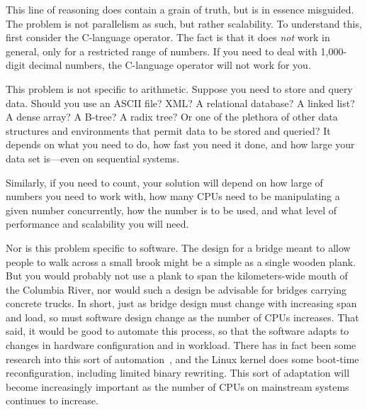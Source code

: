 This line of reasoning does contain a grain of truth, but is in essence
misguided.
The problem is not parallelism as such, but rather scalability.
To understand this, first consider the C-language \co{++} operator.
The fact is that it does \emph{not} work in general, only for a restricted
range of numbers.
If you need to deal with 1,000-digit decimal numbers, the C-language \co{++}
operator will not work for you.

\QuickQuizEnd

This problem is not specific to arithmetic.
Suppose you need to store and query data.
Should you use an ASCII file?
XML\@?
A relational database?
A linked list?
A dense array?
A B-tree?
A radix tree?
Or one of the plethora of other data
structures and environments that permit data to be stored and queried?
It depends on what you need to do, how fast you need it done, and how
large your data set is---even on sequential systems.

Similarly, if you need to count, your solution will depend on how large
of numbers you need to work with, how many CPUs need to be manipulating
a given number concurrently, how the number is to be used, and what
level of performance and scalability you will need.

Nor is this problem specific to software.
The design for a bridge meant to allow people to walk across a small brook
might be a simple as a single wooden plank.
But you would probably not use a plank to span the kilometers-wide mouth of
the Columbia River, nor would such a design be advisable for bridges
carrying concrete trucks.
In short, just as bridge design must change with increasing span and load,
so must software design change as the number of CPUs increases.
That said, it would be good to automate this process, so that the
software adapts to changes in hardware configuration and in workload.
There has in fact been some research into this sort of
automation~\cite{Appavoo03a,Soules03a}, and the Linux kernel does some
boot-time reconfiguration, including limited binary rewriting.
This sort of adaptation will become increasingly important as the
number of CPUs on mainstream systems continues to increase.

